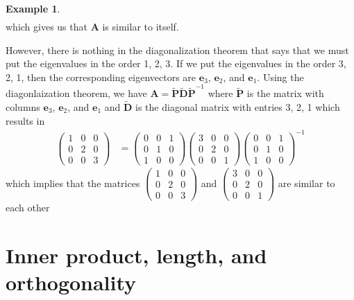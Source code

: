 \documentclass[
]{book}
\theoremstyle{definition}
\theoremstyle{definition}
\newtheorem{example}{Example}[chapter]
\theoremstyle{definition}
\theoremstyle{remark}
\begin{document}
\begin{example}
\[\begin{aligned}
\end{aligned}
\]
which gives us that \(\mathbf{A}\) is similar to itself.

However, there is nothing in the diagonalization theorem that says that we must put the eigenvalues in the order 1, 2, 3. If we put the eigenvalues in the order 3, 2, 1, then the corresponding eigenvectors are \(\mathbf{e}_3\), \(\mathbf{e}_2\), and \(\mathbf{e}_1\). Using the diagonlaization theorem, we have \(\mathbf{A} = \tilde{\mathbf{P}} \tilde{\mathbf{D}} \tilde{\mathbf{P}}^{-1}\) where \(\tilde{\mathbf{P}}\) is the matrix with columns \(\mathbf{e}_3\), \(\mathbf{e}_2\), and \(\mathbf{e}_1\) and \(\tilde{\mathbf{D}}\) is the diagonal matrix with entries 3, 2, 1 which results in
\[
\begin{aligned}
\begin{pmatrix} 1 & 0 & 0 \\ 0 & 2 & 0 \\ 0 & 0 & 3 \end{pmatrix} & = \begin{pmatrix} 0 & 0 & 1 \\ 0 & 1 & 0 \\ 1 & 0 & 0 \end{pmatrix} \begin{pmatrix} 3 & 0 & 0 \\ 0 & 2 & 0 \\ 0 & 0 & 1 \end{pmatrix} \begin{pmatrix} 0 & 0 & 1 \\ 0 & 1 & 0 \\ 1 & 0 & 0 \end{pmatrix}^{-1}
\end{aligned}
\]
which implies that the matrices \(\begin{pmatrix} 1 & 0 & 0 \\ 0 & 2 & 0 \\ 0 & 0 & 3 \end{pmatrix}\) and \(\begin{pmatrix} 3 & 0 & 0 \\ 0 & 2 & 0 \\ 0 & 0 & 1 \end{pmatrix}\) are similar to each other

\end{example}

\hypertarget{inner-product-length-and-orthogonality}{%
\chapter{Inner product, length, and orthogonality}\label{inner-product-length-and-orthogonality}}
\end{document}

